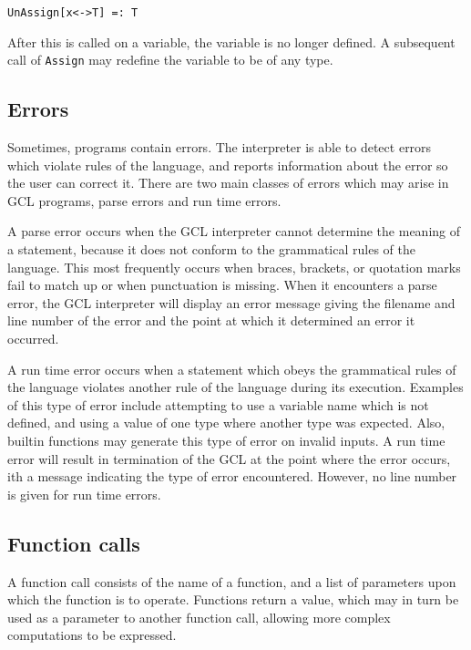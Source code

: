 \begin{verbatim}
UnAssign[x<->T] =: T
\end{verbatim}

\noindent After this is called on a variable, the variable is no longer
defined.  A subsequent call of {\tt Assign} may redefine the variable to
be of any type.

\subsection{Errors}

Sometimes, programs contain errors.  The interpreter is able to detect
errors which violate rules of the language, and reports information
about the error so the user can correct it.  There are two main
classes of errors which may arise in GCL programs, parse errors and
run time errors.

A parse error occurs when the GCL interpreter cannot determine the
meaning of a statement, because it does not conform to the grammatical
rules of the language.  This most frequently occurs when braces,
brackets, or quotation marks fail to match up or when punctuation is
missing.  When it encounters a parse error, the GCL interpreter will
display an error message giving the filename and line number of the
error and the point at which it determined an error it occurred.

A run time error occurs when a statement which obeys the grammatical
rules of the language violates another rule of the language during its
execution.  Examples of this type of error include attempting to use a
variable name which is not defined, and using a value of one type
where another type was expected.  Also, builtin functions may generate
this type of error on invalid inputs.  A run time error will result in
termination of the GCL at the point where the error occurs, ith a
message indicating the type of error encountered.  However, no line
number is given for run time errors.  


\subsection{Function calls}

A function call consists of the name of a function, and a list of parameters
upon which the function is to operate.  Functions return a value, which
may in turn be used as a parameter to another function call, allowing more
complex computations to be expressed.

